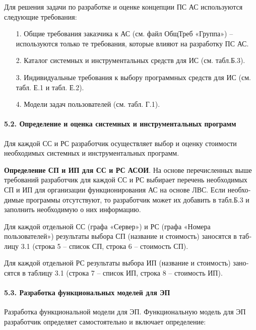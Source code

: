 \documentclass[12pt, a4paper, simple]{eskdtext}
\begin{document}
    Для решения задачи по разработке и оценке концепции ПС АС используются следующие требования:

    \begin{enumerate}
        \item[1.] Общие требования заказчика к АС (см. файл ОбщТреб «Группа») – используются только те требова­ния,
        которые влияют на разработку ПС АС.
        \item[2.] Каталог системных и инструментальных средств для ИС (см. табл.Б.3).
        \item[3.] Индивидуальные требования к выбору программных средств для ИС (см. табл. Е.1 и табл. Е.2).
        \item[4.] Модели задач пользователей (см. табл. Г.1).
    \end{enumerate}

    \newpage
    \paragraph{5.2. Определение и оценка системных и инструментальных программ} \hspace{0pt}  
    
    Для каждой СС и РС разработчик осуществляет выбор и оценку стоимости необходимых системных и инструментальных программ.
    
    \textbf{Определение СП и ИП для СС и РС АСОИ}. На основе перечисленных выше требований разработчик для каждой СС и РС выбирает перечень необ­ходи­мых СП и ИП для организации функционирования АС на основе ЛВС. Если не­обхо­димые программы отсутст­вуют, то разработчик может их добавить в табл.Б.3 и за­полнить необходимую о них ин­формацию.  
    
    Для каждой отдельной СС (графа «Сервер») и РС (графа «Номера пользователей») ре­зультаты выбора СП (название и стоимость)
    заносятся в таб­лицу 3.1 (строка 5 – список СП, строка 6 – стои­мость СП).    
    
    Для каждой отдельной РС ре­зультаты выбора ИП (название и стоимость) зано­сятся в таб­лицу 3.1
    (строка 7 – список ИП, строка 8 – стои­мость ИП).  
    
    \paragraph{5.3. Разработка функциональных моделей для ЭП} \hspace{0pt}
    
    Разработка функциональной модели для ЭП. Функциональную модель для ЭП разработчик опреде­ляет самостоятельно и включает определение:
        
\end{document}
